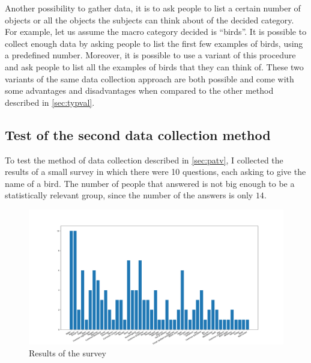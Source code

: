 \documentclass[conference]{IEEEtran}
\begin{document}
			\noindent Another possibility to gather data, it is to ask people to list a certain number of objects or all the objects the subjects can think about of the decided category. For example, let us assume the macro category decided 
			is ``birds''. It is possible to collect enough data by asking people to list the first few examples of birds, using a predefined number. Moreover, it is possible to use a variant of this procedure and ask people 
			to list all the examples of birds that they can think of. These two variants of the same data collection approach are both possible and come with some advantages and disadvantages when compared to the other 
			method described in \ref{sec:typval}. 
			
		\subsection{Test of the second data collection method}
	
		\noindent To test the method of data collection described in \ref{sec:patv}, I collected the results of a small survey in which there were 10 questions, each asking to give the name of a bird. The number of 
		people that answered is not big enough to be a statistically relevant group, since the number of the answers is only $14$.
	
		\begin{figure}
			\centerline{\includegraphics[width=\linewidth]{imgs/survey_hist.png}}
			\caption{Results of the survey}
			\label{fig:7}
		\end{figure}
		
\end{document}
